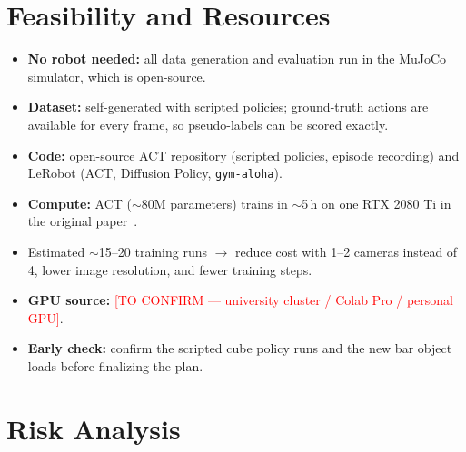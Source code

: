 \documentclass[11pt]{article}
\newcommand{\todo}[1]{\textcolor{red}{[#1]}}
\begin{document}
\section{Feasibility and Resources}
\begin{itemize}
  \item \textbf{No robot needed:} all data generation and evaluation run in
    the MuJoCo simulator, which is open-source.
  \item \textbf{Dataset:} self-generated with scripted policies; ground-truth
    actions are available for every frame, so pseudo-labels can be scored
    exactly.
  \item \textbf{Code:} open-source ACT repository (scripted policies, episode
    recording) and LeRobot (ACT, Diffusion Policy, \texttt{gym-aloha}).
  \item \textbf{Compute:} ACT ($\sim$80M parameters) trains in $\sim$5\,h on
    one RTX 2080 Ti in the original paper~\cite{zhao2023act}.
  \item Estimated $\sim$15--20 training runs $\rightarrow$ reduce cost with
    1--2 cameras instead of 4, lower image resolution, and fewer training
    steps.
  \item \textbf{GPU source:} \todo{TO CONFIRM --- university cluster / Colab
    Pro / personal GPU}.
  \item \textbf{Early check:} confirm the scripted cube policy runs and the new
    bar object loads before finalizing the plan.
\end{itemize}

\section{Risk Analysis}
\end{document}
